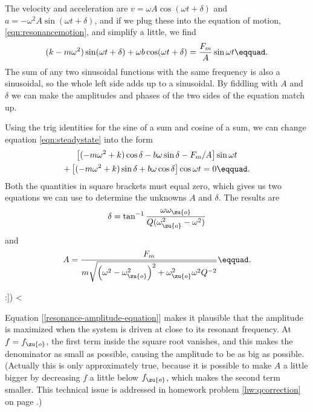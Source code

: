         The velocity and
        acceleration are $v=\omega{}A\cos(\omega  t+\delta)$ and
        $a=-\omega^2A\sin(\omega t+\delta)$, and if we plug these into the equation
        of motion, \eqref{eqn:resonancemotion}, and simplify a little, we find
        \begin{equation}\label{eqn:steadystate}
                (k-m\omega^2)\sin (\omega t+\delta)
                         +\omega b \cos (\omega t+\delta) 
                        = \frac{F_m}{A} \sin \omega t\eqquad.
        \end{equation}
        The sum of any two sinusoidal functions with the same frequency is also
        a sinusoidal, so the whole left side adds up to a sinusoidal. By fiddling with
        $A$ and $\delta$ we can make the amplitudes and phases of the two sides
        of the equation match up.

	Using the trig identities for the sine of a sum
	and cosine of a sum, we can change equation \eqref{eqn:steadystate}
        into the form
	\begin{gather*}
		 \left[(-m\omega^2+k)\cos\delta-b\omega\sin\delta-F_m/A\right]\sin\omega t \\
		+  \left[(-m\omega^2+k)\sin\delta+b\omega\cos\delta\right]\cos\omega t
			= 0\eqquad.
	\end{gather*}
	Both the quantities in square brackets must equal zero, which gives us two
	equations we can use to determine the unknowns $A$ and $\delta$. 
	The results are
	\begin{equation}
		\delta = \tan^{-1}\frac{\omega\omega_\zu{o}}
					{Q(\omega_\zu{o}^2-\omega^2)} \\
	\end{equation}
        and
	\begin{equation}\label{resonance-amplitude-equation}
		A = \frac{F_m}{m\sqrt{\left(\omega^2-\omega_\zu{o}^2\right)^2
				+\omega_\zu{o}^2\omega^2Q^{-2}}}\eqquad.
	\end{equation}
\label{resonance-amplitude}

:])
<%

Equation [\ref{resonance-amplitude-equation}] makes it plausible that the amplitude is maximized
when the system is driven at close to its resonant frequency. At
$f=f_\zu{o}$, the first term inside the square root vanishes,
and this makes the denominator as small as possible, causing
the amplitude to be as big as possible. (Actually this is
only approximately true, because it is possible to make $A$
a little bigger by decreasing $f$ a little below $f_\zu{o}$,
which makes the second term smaller. This technical issue is
addressed in homework problem \ref{hw:qcorrection} on page 
\pageref{hw:qcorrection}.)

